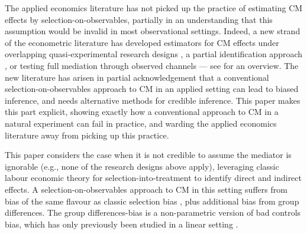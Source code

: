 The applied economics literature has not picked up the practice of estimating CM effects by selection-on-observables, partially in an understanding that this assumption would be invalid in most observational settings.
Indeed, a new strand of the econometric literature has developed estimators for CM effects under overlapping quasi-experimental research designs \citep{deuchert2019direct,frolich2017direct}, a partial identification approach \citep{flores2009identification}, or testing full mediation through observed channels \citep{kwon2024testing} --- see \cite{huber2019review} for an overview.
The new literature has arisen in partial acknowledgement that a conventional selection-on-observables approach to CM in an applied setting can lead to biased inference, and needs alternative methods for credible inference.
This paper makes this part explicit, showing exactly how a conventional approach to CM in a natural experiment can fail in practice, and warding the applied economics literature away from picking up this practice.

This paper considers the case when it is not credible to assume the mediator is ignorable (e.g., none of the research designs above apply), leveraging classic labour economic theory for selection-into-treatment to identify direct and indirect effects.
A selection-on-observables approach to CM in this setting suffers from bias of the same flavour as classic selection bias \citep{heckman1998characterizing}, plus additional bias from group differences.
The group differences-bias is a non-parametric version of bad controls bias, which has only previously been studied in a linear setting \citep{cinelli2024crash,ding2015adjust}.


